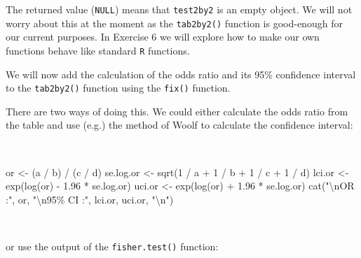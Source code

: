 \documentclass[
  12pt,
]{book}
\newenvironment{Shaded}{\begin{snugshade}}{\end{snugshade}}
\newcommand{\DecValTok}[1]{\textcolor[rgb]{0.00,0.00,0.81}{#1}}
\newcommand{\FloatTok}[1]{\textcolor[rgb]{0.00,0.00,0.81}{#1}}
\newcommand{\FunctionTok}[1]{\textcolor[rgb]{0.00,0.00,0.00}{#1}}
\newcommand{\NormalTok}[1]{#1}
\newcommand{\OtherTok}[1]{\textcolor[rgb]{0.56,0.35,0.01}{#1}}
\newcommand{\SpecialCharTok}[1]{\textcolor[rgb]{0.00,0.00,0.00}{#1}}
\newcommand{\StringTok}[1]{\textcolor[rgb]{0.31,0.60,0.02}{#1}}
\begin{document}
\newpage

The returned value (\texttt{NULL}) means that \texttt{test2by2} is an empty object. We will not worry about this at the moment as the \texttt{tab2by2()} function is good-enough for our current purposes. In Exercise 6 we will explore how to make our own functions behave like standard \texttt{R} functions.

We will now add the calculation of the odds ratio and its 95\% confidence interval to the \texttt{tab2by2()} function using the \texttt{fix()} function.

There are two ways of doing this. We could either calculate the odds ratio from the table and use (e.g.) the method of Woolf to calculate the confidence interval:

~

\begin{Shaded}
\begin{Highlighting}[]
\NormalTok{or }\OtherTok{\textless{}{-}}\NormalTok{ (a }\SpecialCharTok{/}\NormalTok{ b) }\SpecialCharTok{/}\NormalTok{ (c }\SpecialCharTok{/}\NormalTok{ d)}
\NormalTok{se.log.or }\OtherTok{\textless{}{-}} \FunctionTok{sqrt}\NormalTok{(}\DecValTok{1} \SpecialCharTok{/}\NormalTok{ a }\SpecialCharTok{+} \DecValTok{1} \SpecialCharTok{/}\NormalTok{ b }\SpecialCharTok{+} \DecValTok{1} \SpecialCharTok{/}\NormalTok{ c }\SpecialCharTok{+} \DecValTok{1} \SpecialCharTok{/}\NormalTok{ d)}
\NormalTok{lci.or }\OtherTok{\textless{}{-}} \FunctionTok{exp}\NormalTok{(}\FunctionTok{log}\NormalTok{(or) }\SpecialCharTok{{-}} \FloatTok{1.96} \SpecialCharTok{*}\NormalTok{ se.log.or)}
\NormalTok{uci.or }\OtherTok{\textless{}{-}} \FunctionTok{exp}\NormalTok{(}\FunctionTok{log}\NormalTok{(or) }\SpecialCharTok{+} \FloatTok{1.96} \SpecialCharTok{*}\NormalTok{ se.log.or)}
\FunctionTok{cat}\NormalTok{(}\StringTok{"}\SpecialCharTok{\textbackslash{}n}\StringTok{OR     :"}\NormalTok{, or,}
    \StringTok{"}\SpecialCharTok{\textbackslash{}n}\StringTok{95\% CI :"}\NormalTok{, lci.or, uci.or, }\StringTok{"}\SpecialCharTok{\textbackslash{}n}\StringTok{"}\NormalTok{)}
\end{Highlighting}
\end{Shaded}

~

or use the output of the \texttt{fisher.test()} function:

~

\begin{Shaded}
\end{Shaded}
\end{document}

